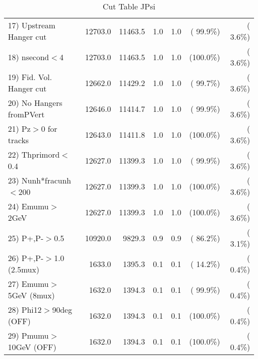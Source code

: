 \begin{table}[h!]
\begin{tabular}{||l||r|r|r|r|r|r||}
 17) Upstream Hanger cut  &      12703.0 &      11463.5 &          1.0 &          1.0 & ( 99.9\%) & (  3.6\%) \\
 18) nsecond$<$4          &      12703.0 &      11463.5 &          1.0 &          1.0 & (100.0\%) & (  3.6\%) \\
 19) Fid. Vol. Hanger cut &      12662.0 &      11429.2 &          1.0 &          1.0 & ( 99.7\%) & (  3.6\%) \\
 20) No Hangers fromPVert &      12646.0 &      11414.7 &          1.0 &          1.0 & ( 99.9\%) & (  3.6\%) \\
 21) Pz$>$0 for tracks    &      12643.0 &      11411.8 &          1.0 &          1.0 & (100.0\%) & (  3.6\%) \\
 22) Thprimord$<$0.4      &      12627.0 &      11399.3 &          1.0 &          1.0 & ( 99.9\%) & (  3.6\%) \\
 23) Nunh*fracunh$<$200   &      12627.0 &      11399.3 &          1.0 &          1.0 & (100.0\%) & (  3.6\%) \\
 24) Emumu$>$2GeV         &      12627.0 &      11399.3 &          1.0 &          1.0 & (100.0\%) & (  3.6\%) \\
 25) P+,P-$>$0.5          &      10920.0 &       9829.3 &          0.9 &          0.9 & ( 86.2\%) & (  3.1\%) \\
 26) P+,P-$>$1.0 (2.5mux) &       1633.0 &       1395.3 &          0.1 &          0.1 & ( 14.2\%) & (  0.4\%) \\
 27) Emumu$>$5GeV  (8mux) &       1632.0 &       1394.3 &          0.1 &          0.1 & ( 99.9\%) & (  0.4\%) \\
 28) Phi12$>$90deg  (OFF) &       1632.0 &       1394.3 &          0.1 &          0.1 & (100.0\%) & (  0.4\%) \\
 29) Pmumu$>$10GeV  (OFF) &       1632.0 &       1394.3 &          0.1 &          0.1 & (100.0\%) & (  0.4\%) \\
 \hline
 \hline
 \end{tabular}
 \caption{Cut Table  JPsi     }
 \label{tab-cutcohjpsi-mumu_jpsi}
 \end{table}
